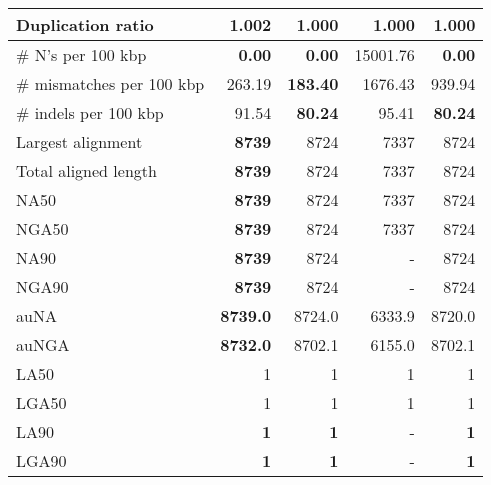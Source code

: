\documentclass[12pt,a4paper]{article}
\begin{document}
\begin{table}[ht]
\begin{center}
\begin{tabular}{|l*{4}{|r}|}
Duplication ratio & 1.002 & {\bf 1.000} & {\bf 1.000} & {\bf 1.000} \\ \hline
\# N's per 100 kbp & {\bf 0.00} & {\bf 0.00} & 15001.76 & {\bf 0.00} \\ \hline
\# mismatches per 100 kbp & 263.19 & {\bf 183.40} & 1676.43 & 939.94 \\ \hline
\# indels per 100 kbp & 91.54 & {\bf 80.24} & 95.41 & {\bf 80.24} \\ \hline
Largest alignment & {\bf 8739} & 8724 & 7337 & 8724 \\ \hline
Total aligned length & {\bf 8739} & 8724 & 7337 & 8724 \\ \hline
NA50 & {\bf 8739} & 8724 & 7337 & 8724 \\ \hline
NGA50 & {\bf 8739} & 8724 & 7337 & 8724 \\ \hline
NA90 & {\bf 8739} & 8724 & - & 8724 \\ \hline
NGA90 & {\bf 8739} & 8724 & - & 8724 \\ \hline
auNA & {\bf 8739.0} & 8724.0 & 6333.9 & 8720.0 \\ \hline
auNGA & {\bf 8732.0} & 8702.1 & 6155.0 & 8702.1 \\ \hline
LA50 & 1 & 1 & 1 & 1 \\ \hline
LGA50 & 1 & 1 & 1 & 1 \\ \hline
LA90 & {\bf 1} & {\bf 1} & - & {\bf 1} \\ \hline
LGA90 & {\bf 1} & {\bf 1} & - & {\bf 1} \\ \hline
\end{tabular}
\end{center}
\end{table}
\end{document}
